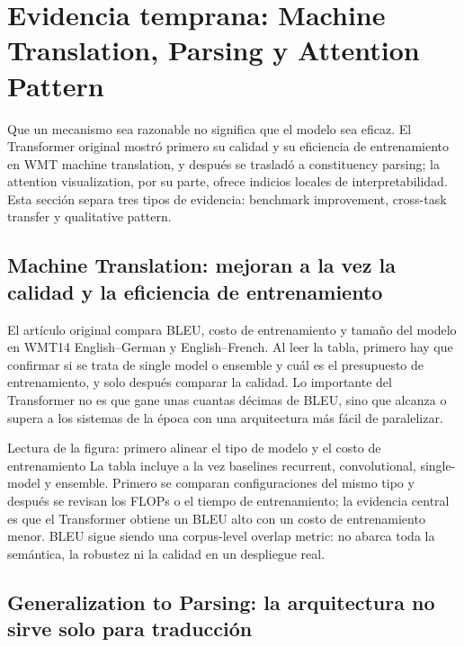 \section{Evidencia temprana: Machine Translation, Parsing y Attention Pattern}

Que un mecanismo sea razonable no significa que el modelo sea eficaz. El Transformer original mostró primero su calidad y su eficiencia de entrenamiento en WMT machine translation, y después se trasladó a constituency parsing; la attention visualization, por su parte, ofrece indicios locales de interpretabilidad. Esta sección separa tres tipos de evidencia: benchmark improvement, cross-task transfer y qualitative pattern.

\subsection{Machine Translation: mejoran a la vez la calidad y la eficiencia de entrenamiento}

El artículo original compara BLEU, costo de entrenamiento y tamaño del modelo en WMT14 English--German y English--French. Al leer la tabla, primero hay que confirmar si se trata de single model o ensemble y cuál es el presupuesto de entrenamiento, y solo después comparar la calidad. Lo importante del Transformer no es que gane unas cuantas décimas de BLEU, sino que alcanza o supera a los sistemas de la época con una arquitectura más fácil de paralelizar.


\begin{knowledgebox}{Lectura de la figura: primero alinear el tipo de modelo y el costo de entrenamiento}
La tabla incluye a la vez baselines recurrent, convolutional, single-model y ensemble. Primero se comparan configuraciones del mismo tipo y después se revisan los FLOPs o el tiempo de entrenamiento; la evidencia central es que el Transformer obtiene un BLEU alto con un costo de entrenamiento menor. BLEU sigue siendo una corpus-level overlap metric: no abarca toda la semántica, la robustez ni la calidad en un despliegue real.
\end{knowledgebox}

\subsection{Generalization to Parsing: la arquitectura no sirve solo para traducción}

